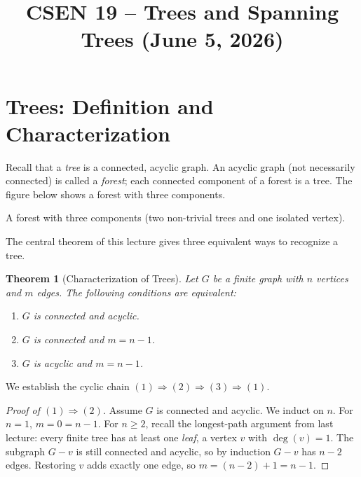 \documentclass[11pt]{article}
\title{CSEN 19 -- Trees and Spanning Trees (June 5, 2026)}
\date{}
\author{}
\newtheorem{theorem}{Theorem}
\theoremstyle{definition}
\begin{document}
\maketitle

\section*{Trees: Definition and Characterization}

Recall that a \emph{tree} is a connected, acyclic graph.  An acyclic graph
(not necessarily connected) is called a \emph{forest}; each connected
component of a forest is a tree.  The figure below shows a forest with
three components.

\begin{center}
\par\smallskip\small
A forest with three components (two non-trivial trees and one isolated vertex).
\end{center}

The central theorem of this lecture gives three equivalent ways to recognize
a tree.

\begin{theorem}[Characterization of Trees]
Let $G$ be a finite graph with $n$ vertices and $m$ edges.  The following
conditions are equivalent:
\begin{enumerate}
  \item[(1)] $G$ is connected and acyclic.
  \item[(2)] $G$ is connected and $m = n-1$.
  \item[(3)] $G$ is acyclic and $m = n-1$.
\end{enumerate}
\end{theorem}

We establish the cyclic chain $(1)\Rightarrow(2)\Rightarrow(3)\Rightarrow(1)$.

\begin{proof}[Proof of $(1)\Rightarrow(2)$]
Assume $G$ is connected and acyclic.  We induct on $n$.  For $n=1$,
$m=0=n-1$.  For $n\geq 2$, recall the longest-path argument from last
lecture: every finite tree has at least one \emph{leaf}, a vertex $v$ with
$\deg(v)=1$.  The subgraph $G-v$ is still connected and acyclic, so by
induction $G-v$ has $n-2$ edges.  Restoring $v$ adds exactly one edge, so
$m=(n-2)+1=n-1$.
\end{proof}
\end{document}
